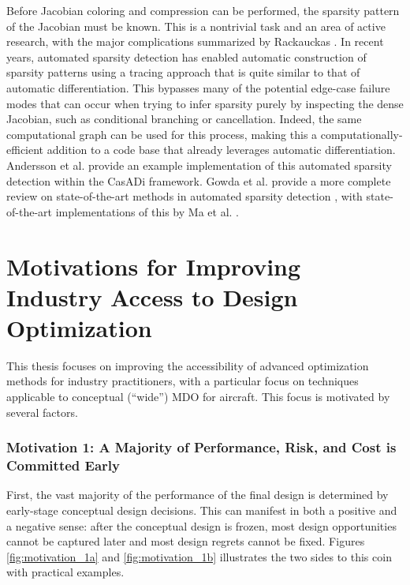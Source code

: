 \documentclass[12pt,vi,oneside,table]{report}
\begin{document}
    Before Jacobian coloring and compression can be performed, the sparsity pattern of the Jacobian must be known. This is a nontrivial task and an area of active research, with the major complications summarized by Rackauckas \cite{rackauckas_generalizing_2021}. In recent years, automated sparsity detection has enabled automatic construction of sparsity patterns using a tracing approach that is quite similar to that of automatic differentiation. This bypasses many of the potential edge-case failure modes that can occur when trying to infer sparsity purely by inspecting the dense Jacobian, such as conditional branching or cancellation. Indeed, the same computational graph can be used for this process, making this a computationally-efficient addition to a code base that already leverages automatic differentiation. Andersson et al. \cite{casadi} provide an example implementation of this automated sparsity detection within the CasADi framework. Gowda et al. provide a more complete review on state-of-the-art methods in automated sparsity detection \cite{gowda_sparsity_2019}, with state-of-the-art implementations of this by Ma et al. \cite{ma_modelingtoolkit_2021}.

    \afterpage{\FloatBarrier}


    \section{Motivations for Improving Industry Access to Design Optimization}

    This thesis focuses on improving the accessibility of advanced optimization methods for industry practitioners, with a particular focus on techniques applicable to conceptual (``wide'') MDO for aircraft. This focus is motivated by several factors.

    \subsubsection*{Motivation 1: A Majority of Performance, Risk, and Cost is Committed Early}

    First, the vast majority of the performance of the final design is determined by early-stage conceptual design decisions. This can manifest in both a positive and a negative sense: after the conceptual design is frozen, most design opportunities cannot be captured later and most design regrets cannot be fixed. Figures \ref{fig:motivation_1a} and \ref{fig:motivation_1b} illustrates the two sides to this coin with practical examples.
\end{document}
